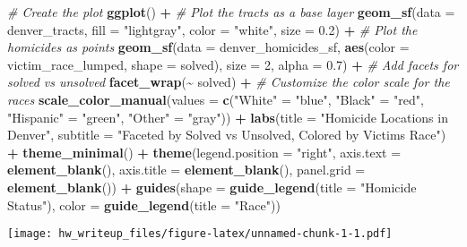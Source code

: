 \documentclass[
]{article}
\newenvironment{Shaded}{\begin{snugshade}}{\end{snugshade}}
\newcommand{\AttributeTok}[1]{\textcolor[rgb]{0.13,0.29,0.53}{#1}}
\newcommand{\CommentTok}[1]{\textcolor[rgb]{0.56,0.35,0.01}{\textit{#1}}}
\newcommand{\DecValTok}[1]{\textcolor[rgb]{0.00,0.00,0.81}{#1}}
\newcommand{\FloatTok}[1]{\textcolor[rgb]{0.00,0.00,0.81}{#1}}
\newcommand{\FunctionTok}[1]{\textcolor[rgb]{0.13,0.29,0.53}{\textbf{#1}}}
\newcommand{\NormalTok}[1]{#1}
\newcommand{\OtherTok}[1]{\textcolor[rgb]{0.56,0.35,0.01}{#1}}
\newcommand{\SpecialCharTok}[1]{\textcolor[rgb]{0.81,0.36,0.00}{\textbf{#1}}}
\newcommand{\StringTok}[1]{\textcolor[rgb]{0.31,0.60,0.02}{#1}}
\begin{document}
\begin{Shaded}
\begin{Highlighting}[]
\CommentTok{\# Create the plot}
\FunctionTok{ggplot}\NormalTok{() }\SpecialCharTok{+}
  \CommentTok{\# Plot the tracts as a base layer}
  \FunctionTok{geom\_sf}\NormalTok{(}\AttributeTok{data =}\NormalTok{ denver\_tracts, }\AttributeTok{fill =} \StringTok{"lightgray"}\NormalTok{, }\AttributeTok{color =} \StringTok{"white"}\NormalTok{, }\AttributeTok{size =} \FloatTok{0.2}\NormalTok{) }\SpecialCharTok{+}
  \CommentTok{\# Plot the homicides as points}
  \FunctionTok{geom\_sf}\NormalTok{(}\AttributeTok{data =}\NormalTok{ denver\_homicides\_sf, }\FunctionTok{aes}\NormalTok{(}\AttributeTok{color =}\NormalTok{ victim\_race\_lumped, }\AttributeTok{shape =}\NormalTok{ solved), }\AttributeTok{size =} \DecValTok{2}\NormalTok{, }\AttributeTok{alpha =} \FloatTok{0.7}\NormalTok{) }\SpecialCharTok{+}
  \CommentTok{\# Add facets for solved vs unsolved}
  \FunctionTok{facet\_wrap}\NormalTok{(}\SpecialCharTok{\textasciitilde{}}\NormalTok{ solved) }\SpecialCharTok{+}
  \CommentTok{\# Customize the color scale for the races}
  \FunctionTok{scale\_color\_manual}\NormalTok{(}\AttributeTok{values =} \FunctionTok{c}\NormalTok{(}\StringTok{"White"} \OtherTok{=} \StringTok{"blue"}\NormalTok{, }\StringTok{"Black"} \OtherTok{=} \StringTok{"red"}\NormalTok{, }\StringTok{"Hispanic"} \OtherTok{=} \StringTok{"green"}\NormalTok{, }\StringTok{"Other"} \OtherTok{=} \StringTok{"gray"}\NormalTok{)) }\SpecialCharTok{+}
  \FunctionTok{labs}\NormalTok{(}\AttributeTok{title =} \StringTok{"Homicide Locations in Denver"}\NormalTok{, }
       \AttributeTok{subtitle =} \StringTok{"Faceted by Solved vs Unsolved, Colored by Victim\textquotesingle{}s Race"}\NormalTok{) }\SpecialCharTok{+}
  \FunctionTok{theme\_minimal}\NormalTok{() }\SpecialCharTok{+}
  \FunctionTok{theme}\NormalTok{(}\AttributeTok{legend.position =} \StringTok{"right"}\NormalTok{,}
        \AttributeTok{axis.text =} \FunctionTok{element\_blank}\NormalTok{(),}
        \AttributeTok{axis.title =} \FunctionTok{element\_blank}\NormalTok{(),}
        \AttributeTok{panel.grid =} \FunctionTok{element\_blank}\NormalTok{()) }\SpecialCharTok{+}
  \FunctionTok{guides}\NormalTok{(}\AttributeTok{shape =} \FunctionTok{guide\_legend}\NormalTok{(}\AttributeTok{title =} \StringTok{"Homicide Status"}\NormalTok{),}
         \AttributeTok{color =} \FunctionTok{guide\_legend}\NormalTok{(}\AttributeTok{title =} \StringTok{"Race"}\NormalTok{))}
\end{Highlighting}
\end{Shaded}

\texttt{[image: hw\_writeup\_files/figure-latex/unnamed-chunk-1-1.pdf]}
\end{document}
